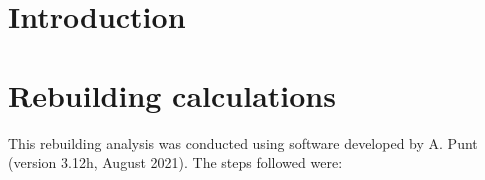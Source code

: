\documentclass[11pt,
  english,
  a4paper,
]{article}
\begin{document}
\leavevmode\tagmcend\tagstructend\par

\pagebreak
\setlength{\parskip}{5mm plus1mm minus1mm}
\setcounter{page}{1}
\renewcommand{\thefigure}{\arabic{figure}}
\renewcommand{\thetable}{\arabic{table}}
\setcounter{table}{0}
\setcounter{figure}{0}

\setlength\parskip{0.2em plus 0.1em minus 0.2em}


\hypertarget{introduction}{%
\section{Introduction}\label{introduction}}

\leavevmode\tagmcend\tagstructend


\hypertarget{rebuilding-calculations}{%
\section{Rebuilding calculations}\label{rebuilding-calculations}}

\leavevmode\tagmcend\tagstructend


This rebuilding analysis was conducted using software developed by A. Punt (version 3.12h, August 2021). The steps followed were:

\leavevmode\tagmcend\tagstructend\par
\end{document}
